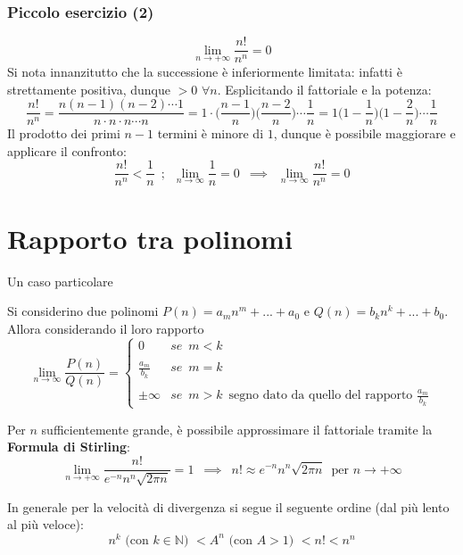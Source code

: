 \documentclass[10pt, oneside]{book}
\theoremstyle{plain}
\begin{document}
\subsubsection*{Piccolo esercizio (2)}
\[\lim \limits_{n \rightarrow + \infty} \frac{n!}{n^n} = 0\]
Si nota innanzitutto che la successione è inferiormente limitata: infatti è strettamente positiva, dunque $> 0$ $\forall n$. Esplicitando il fattoriale e la potenza:
\[\frac{n!}{n^n} = \frac{n (n-1) (n-2) \cdots 1}{n \cdot n \cdot n \cdots n} = 1 \cdot \bigg(\frac{n-1}{n}\bigg) \bigg(\frac{n-2}{n}\bigg) \cdots \frac{1}{n} = 1 \bigg(1 - \frac{1}{n}\bigg) \bigg(1 - \frac{2}{n}\bigg) \cdots \frac{1}{n}\]
Il prodotto dei primi $n-1$ termini è minore di $1$, dunque è possibile maggiorare e applicare il confronto:
\[\frac{n!}{n^n} < \frac{1}{n} \enspace ; \enspace \lim \limits_{n \rightarrow \infty} \frac{1}{n} = 0 \enspace \implies \enspace \lim \limits_{n \rightarrow \infty} \frac{n!}{n^n} = 0\]
\newpage
\section{Rapporto tra polinomi}
Un caso particolare
\begin{prop}
    Si considerino due polinomi $P(n) = a_m n^m + ... + a_0$ e $Q(n) = b_k n^k + ... + b_0$. Allora considerando il loro rapporto
    \[\lim \limits_{n \rightarrow \infty} \frac{P(n)}{Q(n)} = \begin{cases}
        0 & se \enspace m < k\\ \\
        \displaystyle \frac{a_m}{b_k} & se \enspace m = k\\ \\
        \displaystyle \pm \infty & se \enspace m > k \enspace \textrm{segno dato da quello del rapporto } \frac{a_m}{b_k}
    \end{cases}\]
\end{prop}

\begin{oss}
    Per $n$ sufficientemente grande, è possibile approssimare il fattoriale tramite la \textbf{Formula di Stirling}:
    \[\lim \limits_{n \rightarrow +\infty} \frac{n!}{e^{-n} n^n \sqrt{2 \pi n}} = 1 \enspace \implies \enspace n! \approx e^{-n} n^n \sqrt{2 \pi n} \enspace \textrm{per } n \rightarrow +\infty\]
\end{oss}
\begin{oss}
    In generale per la velocità di divergenza si segue il seguente ordine (dal più lento al più veloce):
    \[n^k \textrm{ (con $k \in \mathbb{N}$) } < A^n \textrm{ (con $A > 1$) } < n! < n^n\]
\end{oss}
\end{document}
